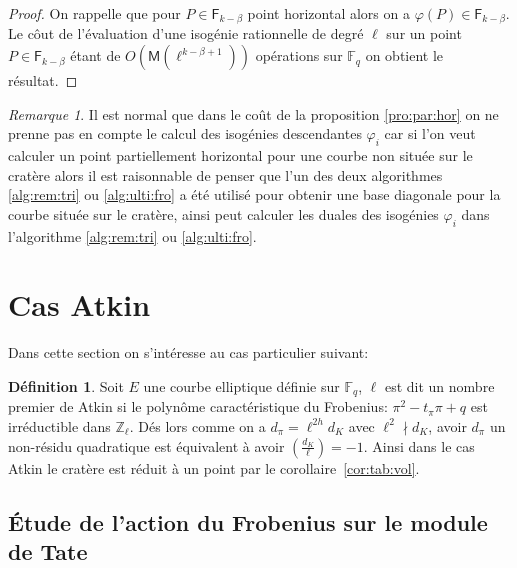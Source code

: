 \documentclass[10pt,a4paper]{book}
\theoremstyle{plain}
\theoremstyle{definition}
\theoremstyle{definition}
\theoremstyle{definition}
\theoremstyle{definition}
\newtheorem{defi}[thm]{Définition}
\theoremstyle{remark}
\newtheorem{rem}[thm]{Remarque}
\theoremstyle{remark}
\theoremstyle{definition}
\begin{document}
\begin{proof}
On rappelle que pour $P \in \mathsf{F}_{k-\beta}$ point horizontal alors on a  $\varphi(P) \in \mathsf{F}_{k-\beta}$. Le côut de l'évaluation d'une isogénie rationnelle de degré $\ell$ sur un point $P \in \mathsf{F}_{k-\beta}$ étant de $O(\mathsf{M}(\ell^{k-\beta+1}))$ opérations sur $\mathbb{F}_q$ on obtient le résultat.
\end{proof}

\begin{rem}
Il est normal que dans le coût de la proposition \ref{pro:par:hor} on ne prenne pas en compte le calcul des isogénies descendantes $\varphi_i$ car si l'on veut calculer un point partiellement horizontal pour une courbe non située sur le cratère alors il est raisonnable de penser que l'un des deux algorithmes  \ref{alg:rem:tri} ou \ref{alg:ulti:fro} a été utilisé pour obtenir une base diagonale pour la courbe située sur le cratère, ainsi peut calculer les duales des isogénies $\varphi_i$ dans l'algorithme \ref{alg:rem:tri} ou \ref{alg:ulti:fro}.
\end{rem}
\section{Cas Atkin}
\label{subs:atk:dir}
Dans cette section on s'intéresse au cas particulier suivant: 
\begin{defi}
\label{def:cas:atk}
Soit $E$ une courbe elliptique définie sur $\mathbb{F}_q$, $\ell$ est dit un 
nombre premier de Atkin si le polynôme caractéristique du Frobenius: 
$\pi^2-t_{\pi}\pi + q$ est irréductible dans $\mathbb{Z}_{\ell}$. Dés lors 
comme on a $d_{\pi}=\ell^{2h}d_{K}$ avec $\ell^2 \nmid d_{K}$, avoir 
$d_{\pi}$ un non-résidu quadratique est équivalent à avoir $\left( 
\frac{d_{K}}{\ell} \right)=-1$. Ainsi dans le cas Atkin le cratère est réduit à
un point par le corollaire~\ref{cor:tab:vol}.
\end{defi}

\subsection{\'Etude de l'action du Frobenius sur le module de Tate}
\end{document}
